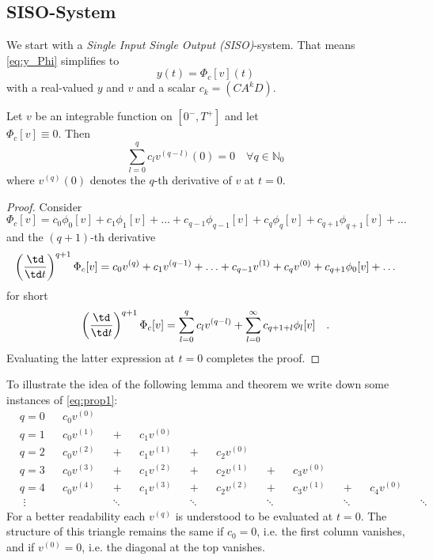 \subsection{SISO-System}
We start with a \textit{Single Input Single Output (SISO)}-system. That means
\eqref{eq:y_Phi} simplifies to
\begin{equation}
	y(t) = \Phi_c[v](t)
\end{equation}
with a real-valued $y$ and $v$ and a scalar $c_k=(CA^kD)$.
\begin{proposition}{}{}
	Let $v$ be an integrable function on $[0^-,T^+]$ and let \\
	$\Phi_c[v]\equiv 0$. Then
	\begin{equation}
	\sum\limits_{l=0}^q c_l v^{(q-l)}(0)=0 \quad \forall q \in \mathbb{N}_0 \tag{$\star$}
	\label{eq:prop1}
	\end{equation}
	where $v^{(q)}(0)$ denotes the $q$-th derivative of $v$ at $t=0$.
\end{proposition}
\begin{proof}
	Consider
	\begin{equation}
	\Phi_c[v] = c_0 \phi_0[v] + c_1 \phi_1[v] + \ldots + c_{q-1}\phi_{q-1}[v] + 
	c_q \phi_q[v] + c_{q+1} \phi_{q+1}[v] + \ldots 
	\end{equation}
	and the $(q+1)$-th derivative
	\begin{equation}
	\left( \frac{\td}{\td t} \right)^{q+1}\Phi_c[v] = c_0 v^{(q)} + c_1 v^{(q-1)} + 
	\ldots 	+ c_{q-1} v^{(1)} + c_q v^{(0)} + c_{q+1} \phi_0[v] + \ldots
	\end{equation}
	for short
	\begin{equation}
	\left( \frac{\td}{\td t} \right)^{q+1}\Phi_c[v] = \sum\limits_{l=0}^q c_l v^{(q-l)} 
	+\sum\limits_{l=0}^\infty c_{q+1+l} \phi_{l}[v] \quad . 
	\end{equation}
	Evaluating the latter expression at $t=0$ completes the proof.
\end{proof}

To illustrate the idea of the following lemma and theorem we write down some 
instances of \eqref{eq:prop1}: 
\begin{align*}
&q = 0& &c_0 v^{(0)} \\
&q = 1& &c_0 v^{(1)} &&+&&c_1 v^{(0)} \\
&q = 2& &c_0 v^{(2)} &&+&&c_1 v^{(1)} &&+&&c_2 v^{(0)} \\
&q = 3& &c_0 v^{(3)} &&+&&c_1 v^{(2)} &&+&&c_2 v^{(1)} && +&&c_3 v^{(0)}\\
&q = 4& &c_0 v^{(4)} &&+&&c_1 v^{(3)} &&+&&c_2 v^{(2)} && +&&c_3 v^{(1)} &&+&& c_4 
v^{(0)} \\ 
&\,\, \vdots && && \ddots && &&\ddots && &&\ddots && &&\ddots && &&\ddots 
\end{align*}
For a better readability each $v^{(q)}$ is understood to be evaluated at $t=0$. The 
structure of this triangle remains the same if $c_0=0$, i.e. the first column vanishes, 
and if $v^{(0)}=0$, i.e. the diagonal at the top vanishes. 

